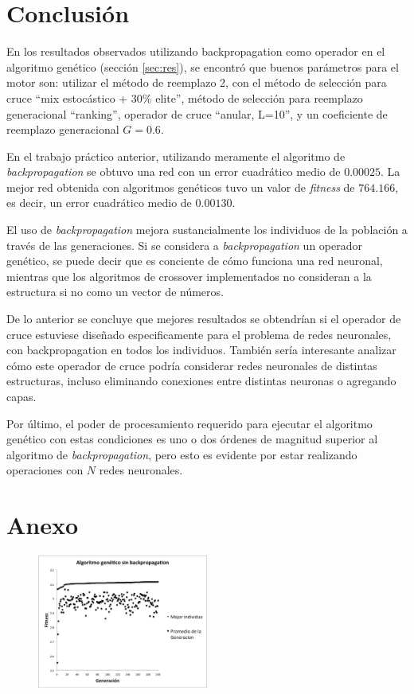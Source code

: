 \documentclass[letterpaper,twocolumn,10pt]{article}
\begin{document}
\section{Conclusión}

En los resultados observados utilizando backpropagation como operador en el 
algoritmo genético (sección \ref{sec:res}), se encontró que buenos
parámetros para el motor son: utilizar el método de reemplazo 2, con
el método de selección para cruce ``mix estocástico + 30\% elite'',
método de selección para reemplazo generacional ``ranking'', operador
de cruce ``anular, L=10'', y un coeficiente de reemplazo generacional $G=0.6$.

En el trabajo práctico anterior, utilizando meramente el algoritmo de
\textit{backpropagation} se obtuvo una red con un error cuadrático medio de $0.00025$. 
La mejor red obtenida con algoritmos genéticos tuvo un valor de \textit{fitness} de
$764.166$, es decir, un error cuadrático medio de $0.00130$.

El uso de \textit{backpropagation} mejora sustancialmente los individuos de la
población a través de las generaciones. Si se considera a \textit{backpropagation} un
operador genético, se puede decir que es conciente de cómo funciona una red neuronal,
mientras que los algoritmos de crossover implementados no consideran a la estructura
si no como un vector de números.

De lo anterior se concluye que mejores resultados se obtendrían si el operador de
cruce estuviese diseñado especificamente para el problema de redes neuronales, con
backpropagation en todos los individuos. También sería interesante analizar cómo
este operador de cruce podría considerar redes neuronales de distintas estructuras,
incluso eliminando conexiones entre distintas neuronas o agregando capas.

Por último, el poder de procesamiento requerido para ejecutar el algoritmo genético
con estas condiciones es uno o dos órdenes de magnitud superior al algoritmo de
\textit{backpropagation}, pero esto es evidente por estar realizando operaciones con
$N$ redes neuronales.

\newpage

\section{Anexo}

\begin{figure}[h]

\includegraphics[width=0.5\textwidth]{No_Backpropagation.png}

\caption{}
\label{img:no_backpropagation}

\end{figure}
\end{document}

